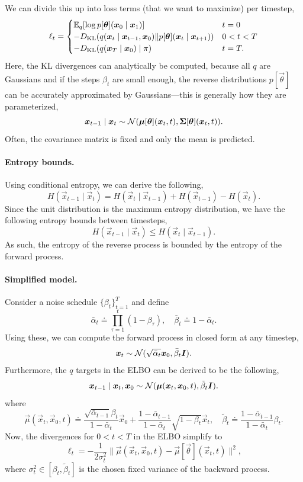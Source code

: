We can divide this up into loss terms (that we want to maximize) per timestep, \[
    \ell_t = \begin{cases}
        \E_q \lft[ \log p[\vec{\theta}](\vec{x}_0 \mid \vec{x}_1) \rgt] & t = 0 \\
        -D_{\mathrm{KL}}(q(\vec{x}_t \mid \vec{x}_{t-1}, \vec{x}_0) \| p[\vec{\theta}](\vec{x}_t \mid \vec{x}_{t+1})) & 0 < t < T \\
        -D_{\mathrm{KL}}(q(\vec{x}_T \mid \vec{x}_0) \mid \pi) & t = T.
    \end{cases}
\]
Here, the KL divergences can analytically be computed, because all $q$ are Gaussians and if the steps
$\beta_t$ are small enough, the reverse distributions $p[\vec{\theta}]$ can be accurately approximated by
Gaussians---this is generally how they are parameterized, \[
    \bm{x}_{t-1} \mid \bm{x}_t \sim \mathcal{N}(\bm{\mu}[\bm{\theta}](\bm{x}_t, t), \bm{\Sigma}[\bm{\theta}](\bm{x}_t, t)).
\]
Often, the covariance matrix is fixed and only the mean is predicted.

\paragraph{Entropy bounds.}

Using conditional entropy, we can derive the following, \[
    H(\vec{x}_{t-1} \mid \vec{x}_t) = H(\vec{x}_t \mid \vec{x}_{t-1}) + H(\vec{x}_{t-1}) - H(\vec{x}_t).
\]
Since the unit distribution is the maximum entropy distribution, we have the following entropy bounds between timesteps, \[
    H(\vec{x}_{t-1} \mid \vec{x}_t) \leq H(\vec{x}_t \mid \vec{x}_{t-1}).
\]
As such, the entropy of the reverse process is bounded by the entropy of the forward process.

\paragraph{Simplified model.}

Consider a noise schedule $\{ \beta_t \}_{t=1}^T$ and define \[
    \bar{\alpha}_t \doteq \prod_{\tau=1}^{t} (1-\beta_\tau), \quad \bar{\beta}_t \doteq 1 - \bar{\alpha}_t.
\]
Using these, we can compute the forward process in closed form at any timestep, \[
    \bm{x}_t \sim \mathcal{N}(\sqrt{\bar{\alpha}_t} \bm{x}_0, \bar{\beta}_t \bm{I}).
\]
Furthermore, the $q$ targets in the ELBO can be derived to be the following, \[
    \bm{x}_{t-1} \mid \bm{x}_t, \bm{x}_0 \sim \mathcal{N}(\bm{\mu}(\bm{x}_t, \bm{x}_0, t), \tilde{\beta}_t \bm{I}).
\]
where \[
    \vec{\mu}(\vec{x}_t, \vec{x}_0, t) \doteq \frac{\sqrt{\bar{\alpha}_{t-1}} \beta_t}{1- \bar{\alpha}_t} \vec{x}_0 + \frac{1-\bar{\alpha}_{t-1}}{1-\bar{\alpha}_t} \sqrt{1-\beta_t} \vec{x}_t, \quad \tilde{\beta}_t \doteq \frac{1-\bar{\alpha}_{t-1}}{1-\bar{\alpha}_t} \beta_t.
\]
Now, the divergences for $0 < t < T$ in the ELBO simplify to \[
    \ell_t = -\frac{1}{2 \sigma_t^2} \| \vec{\mu}(\vec{x}_t, \vec{x}_0, t) - \vec{\mu}[\vec{\theta}](\vec{x}_t, t) \|^2,
\]
where $\sigma_t^2 \in [\beta_t, \tilde{\beta}_t]$ is the chosen fixed variance of the backward process.

